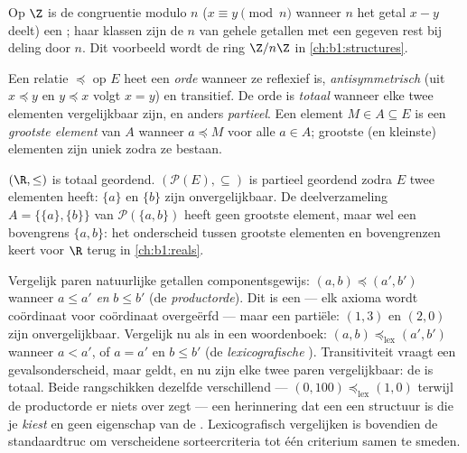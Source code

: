 \begin{example}\label{ex:b1:logic:congruence}
Op $\Z$ is de congruentie modulo $n$ ($x \equiv y \pmod n$ wanneer $n$
het getal $x - y$ deelt) een ; haar klassen zijn de
$n$  van gehele getallen met een gegeven rest bij deling
door $n$. Dit voorbeeld wordt de ring $\Z/n\Z$ in
\cref{ch:b1:structures}.
\end{example}

\begin{definition}[Ordeningsrelatie]\label{def:b1:logic:order}
Een relatie $\preceq$ op $E$ heet een \emph{orde}
wanneer ze reflexief is, \emph{antisymmetrisch} (uit $x \preceq y$ en $y
\preceq x$ volgt $x = y$) en transitief. De orde is \emph{totaal} wanneer
elke twee elementen vergelijkbaar zijn, en anders \emph{partieel}. Een
element $M \in A \subseteq E$ is een \emph{grootste element} van $A$
wanneer $a \preceq M$ voor alle $a \in A$; grootste (en kleinste)
elementen zijn uniek zodra ze bestaan.
\end{definition}

\begin{example}\label{ex:b1:logic:orders}
$(\R, \leq)$ is totaal geordend. $(\mathcal{P}(E), \subseteq)$ is
partieel geordend zodra $E$ twee elementen heeft: $\{a\}$ en $\{b\}$ zijn
onvergelijkbaar. De deelverzameling $A = \{\{a\}, \{b\}\}$ van
$\mathcal{P}(\{a,b\})$ heeft geen grootste element, maar wel een
bovengrens $\{a, b\}$: het onderscheid tussen grootste elementen en
bovengrenzen keert voor $\R$ terug in \cref{ch:b1:reals}.
\end{example}

\begin{example}\label{ex:b1:logic:lexorder}
Vergelijk paren natuurlijke getallen componentsgewijs: $(a, b) \preceq
(a', b')$ wanneer $a \leq a'$ \emph{en} $b \leq b'$ (de
\emph{productorde}). Dit is een  --- elk axioma wordt coördinaat voor
coördinaat overgeërfd --- maar een partiële: $(1, 3)$ en $(2, 0)$ zijn
onvergelijkbaar. Vergelijk nu als in een woordenboek: $(a, b)
\preceq_{\mathrm{lex}} (a', b')$ wanneer $a < a'$, of $a = a'$ en $b \leq
b'$ (de \emph{lexicografische }). Transitiviteit vraagt een
gevalsonderscheid, maar geldt, en nu zijn elke twee paren vergelijkbaar:
de  is totaal. Beide  rangschikken dezelfde 
verschillend --- $(0, 100) \preceq_{\mathrm{lex}} (1, 0)$ terwijl de
productorde er niets over zegt --- een herinnering dat een  een
structuur is die je \emph{kiest} en geen eigenschap van de .
Lexicografisch vergelijken is bovendien de standaardtruc om verscheidene
sorteercriteria tot één criterium samen te smeden.
\end{example}

